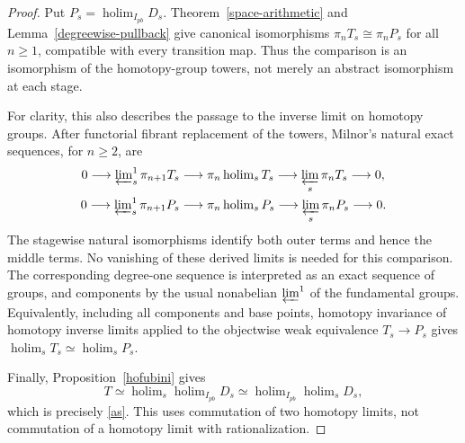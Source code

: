 \documentclass[11pt,a4paper]{article}
\begin{document}
\begin{proof}
Put $P_s=\operatorname{holim}_{I_{pb}}D_s$.
Theorem~\ref{space-arithmetic} and
Lemma~\ref{degreewise-pullback} give canonical isomorphisms
$\pi_nT_s\cong\pi_nP_s$ for all $n\geq1$, compatible with every
transition map.  Thus the comparison is an isomorphism of the
homotopy-group towers, not merely an abstract isomorphism at each
stage.

For clarity, this also describes the passage to the inverse limit
on homotopy groups.  After functorial fibrant replacement of the
towers, Milnor's natural exact sequences, for $n\geq2$, are
\[
\begin{split}
0\longrightarrow\varprojlim\nolimits_s^1\pi_{n+1}T_s
&\longrightarrow\pi_n\operatorname{holim}_sT_s
\longrightarrow\varprojlim_s\pi_nT_s\longrightarrow0,\\
0\longrightarrow\varprojlim\nolimits_s^1\pi_{n+1}P_s
&\longrightarrow\pi_n\operatorname{holim}_sP_s
\longrightarrow\varprojlim_s\pi_nP_s\longrightarrow0.
\end{split}
\]
The stagewise natural isomorphisms identify both outer terms and
hence the middle terms.  No vanishing of these derived limits is
needed for this comparison.  The corresponding degree-one sequence
is interpreted as an exact sequence of groups, and components by
the usual nonabelian $\varprojlim^1$ of the fundamental groups.
Equivalently, including all components and base points, homotopy
invariance of homotopy inverse limits applied to the objectwise
weak equivalence $T_s\to P_s$ gives
$\operatorname{holim}_sT_s\simeq\operatorname{holim}_sP_s$.

Finally, Proposition~\ref{hofubini} gives
\[
 T\simeq\operatorname{holim}_s\operatorname{holim}_{I_{pb}}D_s
 \simeq\operatorname{holim}_{I_{pb}}\operatorname{holim}_sD_s,
\]
which is precisely \eqref{as}.  This uses commutation of two homotopy
limits, not commutation of a homotopy limit with rationalization.
\end{proof}
\end{document}
